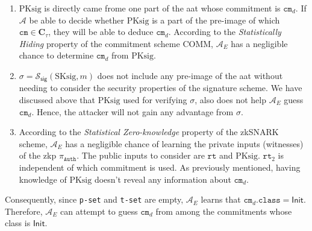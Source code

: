 \begin{enumerate}
	\item $\text{PKsig}$ is directly came frome one part of the \gls{aat} whose commitment is $\texttt{cm}_d$. If $\mathcal{A}$ be able to decide whether $\text{PKsig}$ is a part of the pre-image of which $\texttt{cm}\in  \mathbf{C}_\tau$, they will be able to deduce $\texttt{cm}_d$. According to the \textit{Statistically Hiding} property of the commitment scheme \textsf{COMM},  $\mathcal{A}_E$ has a negligible chance to determine $\texttt{cm}_d$ from $\text{PKsig}$.
	
	\item $\sigma = \mathcal{S}_\mathsf{sig}(\text{SKsig}, m)$ does not include any pre-image of the \gls{aat} without needing to consider the security properties of the signature scheme. We have discussed above that $\text{PKsig}$ used for verifying $\sigma$, also does not help $\mathcal{A}_E$ guess $\texttt{cm}_d$. Hence, the attacker will not gain any advantage from $\sigma$.
	
	\item According to the \textit{Statistical Zero-knowledge} property of the zkSNARK scheme,  $\mathcal{A}_E$ has a negligible chance of learning the private inputs (witnesses) of the \gls{zkp} $\pi_{\texttt{Auth}}$. The public inputs to consider are $\texttt{rt}$ and $\text{PKsig}$.  $\texttt{rt}_2$ is independent of which commitment is used. As previously mentioned, having knowledge of $\text{PKsig}$ doesn’t reveal any information about $\texttt{cm}_d$.
\end{enumerate}

Consequently, since \texttt{p-set} and \texttt{t-set} are empty, \( \mathcal{A}_E \) learns that \( \texttt{cm}_d.\texttt{class} = \mathsf{Init} \). Therefore, \( \mathcal{A}_E \) can attempt to guess \( \texttt{cm}_d \) from among the commitments whose class is \( \mathsf{Init} \).

